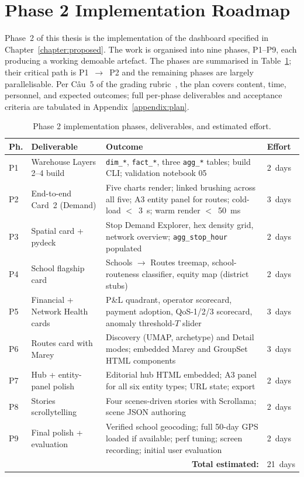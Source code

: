 \section{Phase 2 Implementation Roadmap}
\label{sec:future:roadmap}

Phase~2 of this thesis is the implementation of the dashboard
specified in Chapter~\ref{chapter:proposed}. The work is
organised into nine phases, P1--P9, each producing a working
demoable artefact. The phases are summarised in
Table~\ref{tab:future:roadmap}; their critical path is
P1~$\rightarrow$~P2 and the remaining phases are largely
parallelisable. Per Câu~5 of the grading
rubric~\cite{rubric}, the plan covers content, time, personnel,
and expected outcomes; full per-phase deliverables and
acceptance criteria are tabulated in
Appendix~\ref{appendix:plan}.

\begin{table}[H]
\centering
\caption{Phase 2 implementation phases, deliverables, and
estimated effort.}
\label{tab:future:roadmap}
\footnotesize
\renewcommand{\arraystretch}{1.20}
\begin{tabularx}{\linewidth}{p{0.9cm}p{4.2cm}Xp{1.4cm}}
\hline
\textbf{Ph.} & \textbf{Deliverable} & \textbf{Outcome} & \textbf{Effort} \\
\hline
P1 & Warehouse Layers 2--4 build
   & \texttt{dim\_*}, \texttt{fact\_*}, three \texttt{agg\_*}
     tables; build CLI; validation notebook 05
   & 2~days \\
P2 & End-to-end Card~2 (Demand)
   & Five charts render; linked brushing across all five; A3
     entity panel for routes; cold-load $<$~3~s; warm render
     $<$~50~ms
   & 3~days \\
P3 & Spatial card + pydeck
   & Stop Demand Explorer, hex density grid, network overview;
     \texttt{agg\_stop\_hour} populated
   & 2~days \\
P4 & School flagship card
   & Schools $\rightarrow$ Routes treemap, school-routeness
     classifier, equity map (district stubs)
   & 2~days \\
P5 & Financial + Network Health cards
   & P\&L quadrant, operator scorecard, payment adoption,
     QoS-1/2/3 scorecard, anomaly threshold-$T$ slider
   & 3~days \\
P6 & Routes card with Marey
   & Discovery (UMAP, archetype) and Detail modes; embedded
     Marey and GroupSet HTML components
   & 3~days \\
P7 & Hub + entity-panel polish
   & Editorial hub HTML embedded; A3 panel for all six entity
     types; URL state; export
   & 2~days \\
P8 & Stories scrollytelling
   & Four scenes-driven stories with Scrollama; scene JSON
     authoring
   & 2~days \\
P9 & Final polish + evaluation
   & Verified school geocoding; full 50-day GPS loaded if
     available; perf tuning; screen recording; initial user
     evaluation
   & 2~days \\
\hline
\multicolumn{3}{r}{\textbf{Total estimated:}} & 21~days \\
\hline
\end{tabularx}
\end{table}

